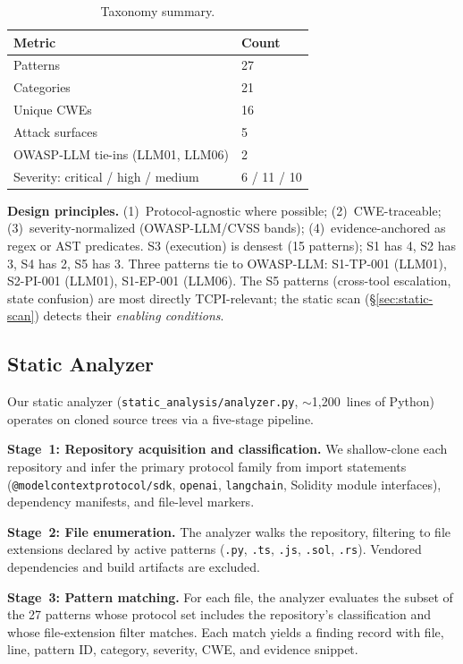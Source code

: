 \documentclass[conference]{IEEEtran}
\begin{document}
\begin{table}[t]
\centering\small
\caption{Taxonomy summary.}
\label{tab:taxonomy-summary}
\begin{tabular}{ll}
\toprule
Metric & Count \\
\midrule
Patterns & 27 \\
Categories & 21 \\
Unique CWEs & 16 \\
Attack surfaces & 5 \\
OWASP-LLM tie-ins (LLM01, LLM06) & 2 \\
Severity: critical / high / medium & 6 / 11 / 10 \\
\bottomrule
\end{tabular}
\end{table}

\textbf{Design principles.}
(1)~Protocol-agnostic where possible;
(2)~CWE-traceable;
(3)~severity-normalized (OWASP-LLM/CVSS bands);
(4)~evidence-anchored as regex or AST predicates.
S3 (execution) is densest (15 patterns); S1 has 4, S2 has 3, S4 has 2, S5 has 3.
Three patterns tie to OWASP-LLM: S1-TP-001 (LLM01), S2-PI-001 (LLM01), S1-EP-001 (LLM06).
The S5 patterns (cross-tool escalation, state confusion) are most directly TCPI-relevant; the static scan (\S\ref{sec:static-scan}) detects their \emph{enabling conditions}.

\subsection{Static Analyzer}

Our static analyzer (\texttt{static\_analysis/analyzer.py},
${\sim}$1,200~lines of Python) operates on cloned source trees via a
five-stage pipeline.

\textbf{Stage~1: Repository acquisition and classification.}
We shallow-clone each repository and infer the primary protocol family
from import statements (\texttt{@modelcontextprotocol/sdk},
\texttt{openai}, \texttt{langchain}, Solidity module interfaces),
dependency manifests, and file-level markers.

\textbf{Stage~2: File enumeration.}
The analyzer walks the repository, filtering to file extensions
declared by active patterns (\texttt{.py}, \texttt{.ts}, \texttt{.js},
\texttt{.sol}, \texttt{.rs}).  Vendored dependencies and build
artifacts are excluded.

\textbf{Stage~3: Pattern matching.}
For each file, the analyzer evaluates the subset of the 27 patterns
whose protocol set includes the repository's classification and whose
file-extension filter matches.  Each match yields a finding record with file, line,
pattern ID, category, severity, CWE, and evidence snippet.
\end{document}
